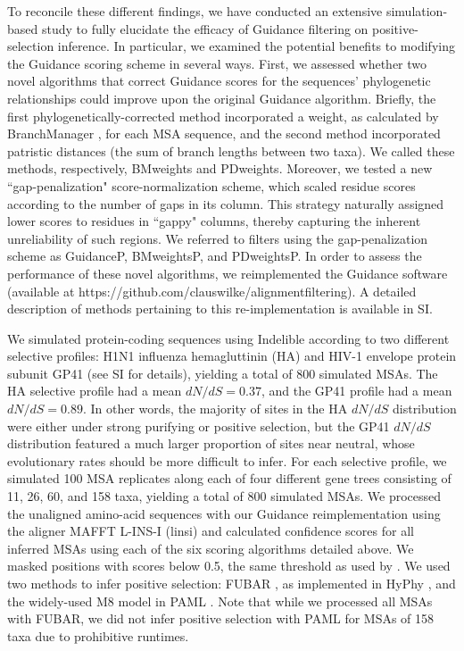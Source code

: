 \documentclass[11pt]{article}
\begin{document}
To reconcile these different findings, we have conducted an extensive simulation-based study to fully elucidate the efficacy of Guidance filtering on positive-selection inference. In particular, we examined the potential benefits to modifying the Guidance scoring scheme in several ways.  First, we assessed whether two novel algorithms that correct Guidance scores for the sequences' phylogenetic relationships could improve upon the original Guidance algorithm. Briefly, the first phylogenetically-corrected method incorporated a weight, as calculated by BranchManager \citep{Stone2007}, for each MSA sequence, and the second method incorporated patristic distances (the sum of branch lengths between two taxa). We called these methods, respectively, BMweights and PDweights. Moreover, we tested a new ``gap-penalization" score-normalization scheme, which scaled residue scores according to the number of gaps in its column. This strategy naturally assigned lower scores to residues in ``gappy" columns, thereby capturing the inherent unreliability of such regions. We referred to filters using the gap-penalization scheme as GuidanceP, BMweightsP, and PDweightsP. In order to assess the performance of these novel algorithms, we reimplemented the Guidance software (available at https://github.com/clauswilke/alignment\underline{\hspace*{0.2cm}}filtering). A detailed description of methods pertaining to this re-implementation is available in SI.

We simulated protein-coding sequences using Indelible \citep{Fletcher2009} according to two different selective profiles: H1N1 influenza hemagluttinin (HA) and HIV-1 envelope protein subunit GP41 (see SI for details), yielding a total of 800 simulated MSAs. The HA selective profile had a mean $dN/dS = 0.37$, and the GP41 profile had a mean $dN/dS = 0.89$. In other words, the majority of sites in the HA $dN/dS$ distribution were either under strong purifying or positive selection, but the GP41 $dN/dS$ distribution featured a much larger proportion of sites near neutral, whose evolutionary rates should be more difficult to infer. For each selective profile, we simulated 100 MSA replicates along each of four different gene trees consisting of 11, 26, 60, and 158 taxa, yielding a total of 800 simulated MSAs. We processed the unaligned amino-acid sequences with our Guidance reimplementation using the aligner MAFFT L-INS-I (linsi) \citep{Katoh2005} and calculated confidence scores for all inferred MSAs using each of the six scoring algorithms detailed above. We masked positions with scores below 0.5, the same threshold as used by \citet{Jordan2012}. We used two methods to infer positive selection: FUBAR \citep{Murrell2013}, as implemented in HyPhy \citep{Pond2005}, and the widely-used M8 model in PAML \citep{Yang2007}. Note that while we processed all MSAs with FUBAR, we did not infer positive selection with PAML for MSAs of 158 taxa due to prohibitive runtimes. 
\end{document}
